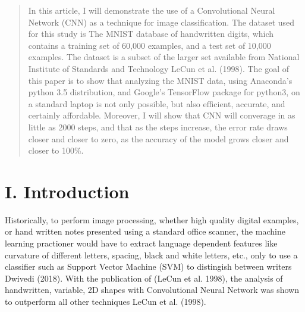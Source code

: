 \documentclass[conference,final,]{IEEEtran}
\begin{document}
\begin{abstract}
In this article, I will demonstrate the use of a Convolutional Neural
Network (CNN) as a technique for image classification. The dataset used
for this study is The MNIST database of handwritten digits, which
contains a training set of 60,000 examples, and a test set of 10,000
examples. The dataset is a subset of the larger set available from
National Institute of Standards and Technology LeCun et al. (1998). The
goal of this paper is to show that analyzing the MNIST data, using
Anaconda's python 3.5 distribution, and Google's TensorFlow package for
python3, on a standard laptop is not only possible, but also efficient,
accurate, and certainly affordable. Moreover, I will show that CNN will
converage in as little as 2000 steps, and that as the steps increase,
the error rate draws closer and closer to zero, as the accuracy of the
model grows closer and closer to 100\%.
\end{abstract}





\maketitle


%
\IEEEpeerreviewmaketitle


\section{I. Introduction}\label{i.-introduction}

Historically, to perform image processing, whether high quality digital
examples, or hand written notes presented using a standard office
scanner, the machine learning practioner would have to extract language
dependent features like curvature of different letters, spacing, black
and white letters, etc., only to use a classifier such as Support Vector
Machine (SVM) to distingish between writers Dwivedi (2018). With the
publication of (LeCun et al. 1998), the analysis of handwritten,
variable, 2D shapes with Convolutional Neural Network was shown to
outperform all other techniques LeCun et al. (1998).
\end{document}
